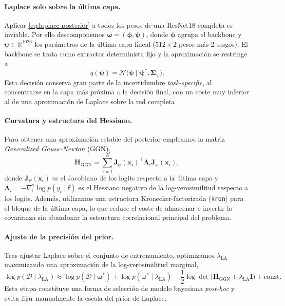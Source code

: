 \documentclass{article}
\begin{document}
\paragraph{Laplace solo sobre la \'ultima capa.}
Aplicar \eqref{eq:laplace-posterior} a todos los pesos de una ResNet18
completa es inviable. Por ello descomponemos
\(\boldsymbol{\omega}=(\boldsymbol{\phi},\boldsymbol{\psi})\), donde
\(\boldsymbol{\phi}\) agrupa el backbone y
\(\boldsymbol{\psi}\in\mathbb{R}^{1026}\) los par\'ametros de la
\'ultima capa lineal (\(512\times 2\) pesos m\'as 2 sesgos). El
backbone se trata como extractor determinista fijo y la aproximaci\'on
se restringe a
\begin{equation}
q(\boldsymbol{\psi})
=
\mathcal{N}
\bigl(
\boldsymbol{\psi}\mid
\boldsymbol{\psi}^{*},
\mathbf{\Sigma}_{\psi}
\bigr).
\label{eq:last-layer-laplace}
\end{equation}
Esta decisi\'on conserva gran parte de la incertidumbre \emph{task-specific}, al concentrarse en la capa m\'as pr\'oxima a la decisi\'on final,
con un coste muy inferior al de una aproximaci\'on de Laplace sobre la red
completa

\paragraph{Curvatura y estructura del Hessiano.}
Para obtener una aproximaci\'on estable del posterior empleamos la
matriz \emph{Generalized Gauss--Newton} (GGN),
\begin{equation}
\mathbf{H}_{\mathrm{GGN}}
=
\sum_{i=1}^{N}
\mathbf{J}_{\psi}(\mathbf{x}_i)^{\top}
\mathbf{\Lambda}_i
\mathbf{J}_{\psi}(\mathbf{x}_i),
\label{eq:ggn}
\end{equation}
donde \(\mathbf{J}_{\psi}(\mathbf{x}_i)\) es el Jacobiano de los logits
respecto a la \'ultima capa y
\(
\mathbf{\Lambda}_i
=
-\nabla^2_{\mathbf{f}}
\log p(y_i\mid \mathbf{f})
\)
es el Hessiano negativo de la log-verosimilitud respecto a los logits.
Adem\'as, utilizamos una estructura Kronecker-factorizada
(\texttt{kron}) para el bloque de la \'ultima capa, lo que reduce el
coste de almacenar e invertir la covarianza sin abandonar la estructura
correlacional principal del problema.

\paragraph{Ajuste de la precisi\'on del prior.}
Tras ajustar Laplace sobre el conjunto de entrenamiento, optimizamos
\(\lambda_{\mathrm{LA}}\) maximizando una aproximaci\'on de la
log-verosimilitud marginal,
\begin{equation}
\log p(\mathcal{D}\mid \lambda_{\mathrm{LA}})
\approx
\log p(\mathcal{D}\mid \boldsymbol{\omega}^{*})
+
\log p(\boldsymbol{\omega}^{*}\mid \lambda_{\mathrm{LA}})
-
\frac{1}{2}\log
\det
\bigl(
\mathbf{H}_{\mathrm{GGN}}+\lambda_{\mathrm{LA}}\mathbf{I}
\bigr)
+
\mathrm{const}.
\label{eq:marglik}
\end{equation}
Esta etapa constituye una forma de selecci\'on de modelo bayesiana
\emph{post-hoc} y evita fijar manualmente la escala del prior de
Laplace.
\end{document}
